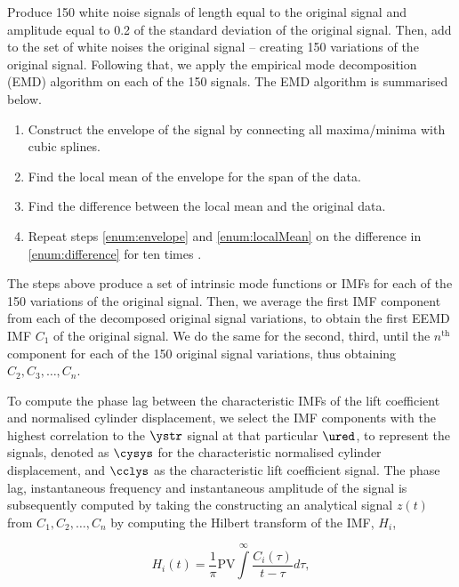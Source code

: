 \documentclass[a4paper,fleqn]{cas-sc}
\begin{document}
Produce 150 white noise signals of length equal to the original signal and amplitude equal to 0.2 of the standard deviation of the original signal. Then, add to the set of white noises the original signal -- creating 150 variations of the original signal. Following that, we apply the empirical mode decomposition (EMD) algorithm on each of the 150 signals. The EMD algorithm is summarised below.

\begin{enumerate} \label{enumerate:emd}
  \item Construct the envelope of the signal by connecting all maxima/minima with cubic splines. \label{enum:envelope}
  \item Find the local mean of the envelope for the span of the data. \label{enum:localMean}
  \item Find the difference between the local mean and the original data. \label{enum:difference}
  \item Repeat steps \ref{enum:envelope} and \ref{enum:localMean} on the difference in \ref{enum:difference} for ten times \citep{Wu2008}.
\end{enumerate}

The steps above produce a set of intrinsic mode functions or IMFs for each of the 150 variations of the original signal. Then, we average the first IMF component from each of the decomposed original signal variations, to obtain the first EEMD IMF $C_{1}$ of the original signal. We do the same for the second, third, until the $n^{\text{th}}$ component for each of the 150 original signal variations, thus obtaining $C_{2},C_{3},\dots,C_{n}$.

To compute the phase lag between the characteristic IMFs of the lift coefficient and normalised cylinder displacement, we select the IMF components with the highest correlation to the $\ystr$ signal at that particular $\ured$, to represent the signals, denoted as $\cysys$ for the characteristic normalised cylinder displacement, and $\cclys$ as the characteristic lift coefficient signal. The phase lag, instantaneous frequency and instantaneous amplitude of the signal is subsequently computed by taking the constructing an analytical signal $z \left( t \right)$ from $C_{1},C_{2},\dots,C_{n}$ by computing the Hilbert transform of the IMF, $H_{i}$,

\begin{equation}
  H_{i} \left( t \right) = \frac{1}{\pi} \text{PV} \int\limits_{}^{\infty} \frac{C_{i} \left( \tau \right)}{t - \tau} d\tau,
  \label{eq:hilbertTransform}
\end{equation}
\end{document}
